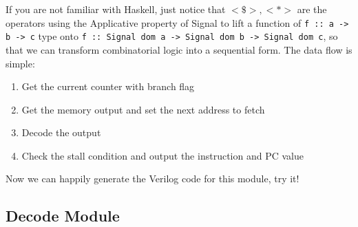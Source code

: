 If you are not familiar with Haskell, just notice that $<\$>, <*>$ are the operators using the Applicative property of Signal to lift a function of \texttt{f :: a -> b -> c} type onto \texttt{f :: Signal dom a -> Signal dom b -> Signal dom c}, so that we can transform combinatorial logic into a sequential form.
The data flow is simple:
\begin{enumerate}
	\item Get the current counter with branch flag
	\item Get the memory output and set the next address to fetch
	\item Decode the output
	\item Check the stall condition and output the instruction and PC value
\end{enumerate}
Now we can happily generate the Verilog code for this module, try it!

\subsection{Decode Module}
